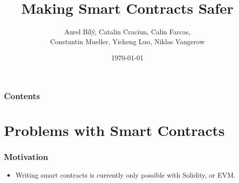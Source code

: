 \documentclass{beamer}
\title{Making Smart Contracts Safer}
\author{Aurel Bílý, Catalin Craciun, Calin Farcas,\\Constantin Mueller, Yicheng Luo, Niklas Vangerow}
\date{\today}
\begin{document}
\begin{frame}
\titlepage
\end{frame}

\begin{frame}
\frametitle{Contents}
\tableofcontents
\end{frame}



\section{Problems with Smart Contracts}
%
%
%

\begin{frame}
\frametitle{Motivation}
\begin{itemize}
    \item Writing smart contracts is currently only possible with Solidity, or EVM.
\end{itemize}
\end{frame}
\end{document}
